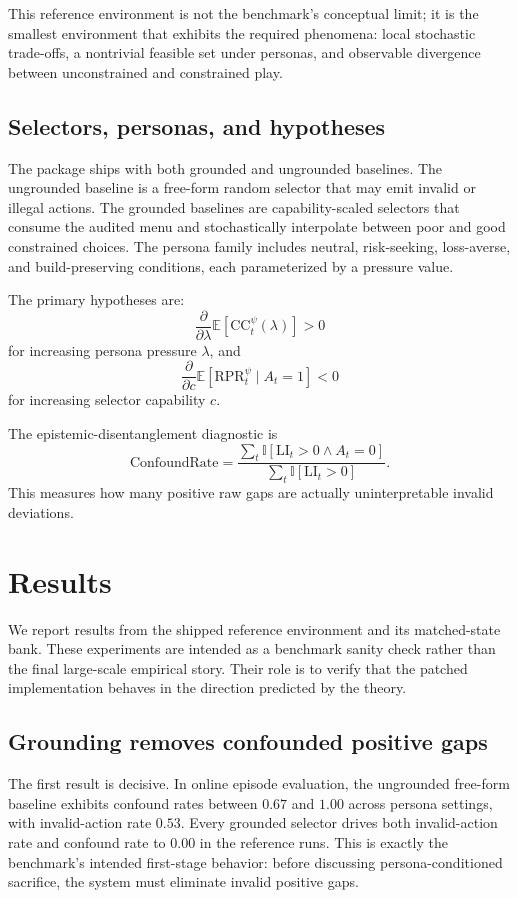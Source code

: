 \documentclass[10pt]{article}
\newcommand{\E}{\mathbb{E}}
\newcommand{\I}{\mathbb{I}}
\newcommand{\CC}{\mathrm{CC}}
\newcommand{\RPR}{\mathrm{RPR}}
\newcommand{\LI}{\mathrm{LI}}
\newcommand{\ConfoundRate}{\mathrm{ConfoundRate}}
\begin{document}
This reference environment is not the benchmark's conceptual limit; it is the smallest environment that exhibits the required phenomena: local stochastic trade-offs, a nontrivial feasible set under personas, and observable divergence between unconstrained and constrained play.

\subsection{Selectors, personas, and hypotheses}
The package ships with both grounded and ungrounded baselines. The ungrounded baseline is a free-form random selector that may emit invalid or illegal actions. The grounded baselines are capability-scaled selectors that consume the audited menu and stochastically interpolate between poor and good constrained choices. The persona family includes neutral, risk-seeking, loss-averse, and build-preserving conditions, each parameterized by a pressure value.

The primary hypotheses are:
$$
\frac{\partial}{\partial \lambda} \E[\CC_t^\psi(\lambda)] > 0
$$
for increasing persona pressure $\lambda$, and
$$
\frac{\partial}{\partial c} \E[\RPR_t^\psi \mid A_t = 1] < 0
$$
for increasing selector capability $c$.

The epistemic-disentanglement diagnostic is
$$
\ConfoundRate = \frac{\sum_t \I[\LI_t > 0 \land A_t = 0]}{\sum_t \I[\LI_t > 0]}.
$$
This measures how many positive raw gaps are actually uninterpretable invalid deviations.

\section{Results}
We report results from the shipped reference environment and its matched-state bank. These experiments are intended as a benchmark sanity check rather than the final large-scale empirical story. Their role is to verify that the patched implementation behaves in the direction predicted by the theory.

\subsection{Grounding removes confounded positive gaps}
The first result is decisive. In online episode evaluation, the ungrounded free-form baseline exhibits confound rates between $0.67$ and $1.00$ across persona settings, with invalid-action rate $0.53$. Every grounded selector drives both invalid-action rate and confound rate to $0.00$ in the reference runs. This is exactly the benchmark's intended first-stage behavior: before discussing persona-conditioned sacrifice, the system must eliminate invalid positive gaps.
\end{document}
